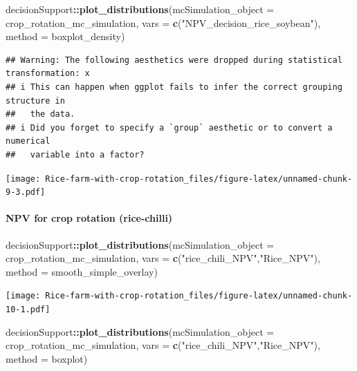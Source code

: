 \documentclass[
]{article}
\newenvironment{Shaded}{\begin{snugshade}}{\end{snugshade}}
\newcommand{\AttributeTok}[1]{\textcolor[rgb]{0.13,0.29,0.53}{#1}}
\newcommand{\FunctionTok}[1]{\textcolor[rgb]{0.13,0.29,0.53}{\textbf{#1}}}
\newcommand{\NormalTok}[1]{#1}
\newcommand{\SpecialCharTok}[1]{\textcolor[rgb]{0.81,0.36,0.00}{\textbf{#1}}}
\newcommand{\StringTok}[1]{\textcolor[rgb]{0.31,0.60,0.02}{#1}}
\begin{document}
\begin{Shaded}
\begin{Highlighting}[]
\NormalTok{decisionSupport}\SpecialCharTok{::}\FunctionTok{plot\_distributions}\NormalTok{(}\AttributeTok{mcSimulation\_object =}\NormalTok{ crop\_rotation\_mc\_simulation, }
                                    \AttributeTok{vars =} \FunctionTok{c}\NormalTok{(}\StringTok{"NPV\_decision\_rice\_soybean"}\NormalTok{),}
                                    \AttributeTok{method =} \StringTok{\textquotesingle{}boxplot\_density\textquotesingle{}}\NormalTok{)}
\end{Highlighting}
\end{Shaded}

\begin{verbatim}
## Warning: The following aesthetics were dropped during statistical transformation: x
## i This can happen when ggplot fails to infer the correct grouping structure in
##   the data.
## i Did you forget to specify a `group` aesthetic or to convert a numerical
##   variable into a factor?
\end{verbatim}

\texttt{[image: Rice-farm-with-crop-rotation\_files/figure-latex/unnamed-chunk-9-3.pdf]}

\hypertarget{npv-for-crop-rotation-rice-chilli}{%
\paragraph{NPV for crop rotation
(rice-chilli)}\label{npv-for-crop-rotation-rice-chilli}}

\begin{Shaded}
\begin{Highlighting}[]
\NormalTok{decisionSupport}\SpecialCharTok{::}\FunctionTok{plot\_distributions}\NormalTok{(}\AttributeTok{mcSimulation\_object =}\NormalTok{ crop\_rotation\_mc\_simulation, }
                                    \AttributeTok{vars =} \FunctionTok{c}\NormalTok{(}\StringTok{"rice\_chili\_NPV"}\NormalTok{,}\StringTok{"Rice\_NPV"}\NormalTok{),}
                                    \AttributeTok{method =} \StringTok{\textquotesingle{}smooth\_simple\_overlay\textquotesingle{}}\NormalTok{)}
\end{Highlighting}
\end{Shaded}

\texttt{[image: Rice-farm-with-crop-rotation\_files/figure-latex/unnamed-chunk-10-1.pdf]}

\begin{Shaded}
\begin{Highlighting}[]
\NormalTok{decisionSupport}\SpecialCharTok{::}\FunctionTok{plot\_distributions}\NormalTok{(}\AttributeTok{mcSimulation\_object =}\NormalTok{ crop\_rotation\_mc\_simulation, }
                                    \AttributeTok{vars =} \FunctionTok{c}\NormalTok{(}\StringTok{"rice\_chili\_NPV"}\NormalTok{,}\StringTok{"Rice\_NPV"}\NormalTok{),}
                                    \AttributeTok{method =} \StringTok{\textquotesingle{}boxplot\textquotesingle{}}\NormalTok{)}
\end{Highlighting}
\end{Shaded}
\end{document}
